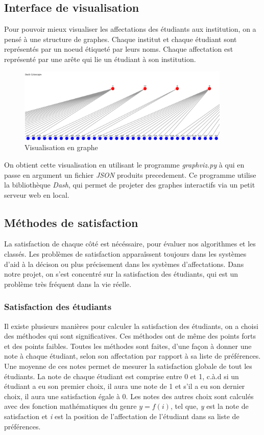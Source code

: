 \documentclass[12pt,titlepage]{article}
\begin{document}
\subsection{Interface de visualisation}

Pour pouvoir mieux visualiser les affectations des étudiants aux institution, on a pensé à une structure de graphes. Chaque institut et chaque étudiant sont représentés par un noeud étiqueté par leurs noms. Chaque affectation est représenté par une arête qui lie un étudiant à son institution.

\begin{figure}[!h]
  \centering
  \caption{Visualisation en graphe}
  \includegraphics[width = 0.9\textwidth]{img/Screen_graph_dash.png}
\end{figure}

On obtient cette visualisation en utilisant le programme \textit{graphviz.py} à qui en passe en argument un fichier \textit{JSON} produits precedement. Ce programme utilise la bibliothèque \textit{Dash}, qui permet de projeter des graphes interactifs via un petit serveur web en local.

\subsection{Méthodes de satisfaction}
La satisfaction de chaque côté est nécéssaire, pour évaluer nos algorithmes et les classés. Les problèmes de satisfaction apparaîssent toujours dans les systèmes d'aid à la décison ou plus précisement dans les systèmes d'affectations. Dans notre projet, on s'est concentré sur la satisfaction des étudiants, qui est un problème très fréquent dans la vie réelle. 
\subsubsection*{Satisfaction des étudiants}
Il existe plusieurs manières pour calculer la satisfaction des étudiants, on a choisi des méthodes qui sont significatives. Ces méthodes ont de même des points forts et des points faibles.
Toutes les méthodes sont faites, d'une façon à donner une note à chaque étudiant, selon son affectation par rapport à sa liste de préférences. Une moyenne de ces notes permet de mesurer la satisfaction globale de tout les étudiants. 
La note de chaque étudiant est comprise entre 0 et 1, c.à.d si un étudiant a eu son premier choix, il aura une note de 1 et s'il a eu son dernier choix, il aura une satisfaction égale à 0. Les notes des autres choix sont calculés avec des fonction mathématiques du genre $y = f(i)$, tel que, \textit{y} est la note de satisfaction et \textit{i} est la position de l'affectation de l'étudiant dans sa liste de préférences. 
\end{document}
